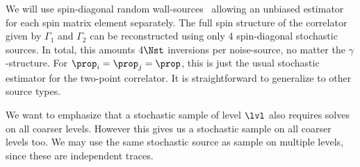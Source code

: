 
We will use spin-diagonal random wall-sources~\cite{ETM:2008zte} allowing an unbiased estimator for each spin matrix element separately.
The full spin structure of the correlator given by $\Gamma_1$ and $\Gamma_2$ can be reconstructed using only \num{4} spin-diagonal stochastic sources.
In total, this amounts $4 \Nst$ inversions per noise-source, no matter the $\gamma$-structure.
For $\prop_i = \prop_j = \prop$, this is just the usual stochastic estimator for the two-point correlator.
It is straightforward to generalize to other source types.

We want to emphasize that a stochastic sample of level $\lvl$ also requires solves on all coarser levels.
However this gives us a stochastic sample on all coarser levels too.
We may use the same stochastic source as sample on multiple levels, since these are independent traces.



